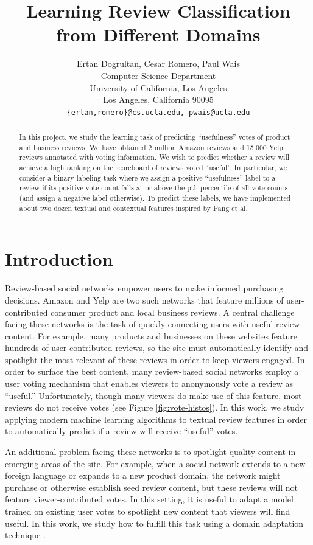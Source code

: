 \documentclass[letterpaper]{article}
\title{Learning Review Classification from Different Domains}
\author{Ertan Dogrultan, Cesar Romero, Paul Wais\\
Computer Science Department \\
University of California, Los Angeles\\
Los Angeles, California 90095\\
\texttt{\{ertan,romero\}@cs.ucla.edu, pwais@ucla.edu}}
\begin{document}
\maketitle
\begin{abstract}
  In this project, we study the learning task of predicting
  ``usefulness'' votes of product and business reviews.  We have
  obtained 2 million Amazon reviews and 15,000 Yelp reviews annotated
  with voting information.  We wish to predict whether a review will
  achieve a high ranking on the scoreboard of reviews voted
  ``useful''.  In particular, we consider a binary labeling task where
  we assign a positive ``usefulness'' label to a review if its
  positive vote count falls at or above the pth percentile of all vote
  counts (and assign a negative label otherwise).  To predict these
  labels, we have implemented about two dozen textual and contextual
  features inspired by Pang et al. \cite{PangSentimentClassification}
\end{abstract}

\section{Introduction}
\label{sec:introduction}

Review-based social networks empower users to make informed purchasing
decisions.  Amazon and Yelp are two such networks that feature
millions of user-contributed consumer product and local business
reviews.  A central challenge facing these networks is the task of
quickly connecting users with useful review content.  For example,
many products and businesses on these websites feature hundreds of
user-contributed reviews, so the site must automatically identify and
spotlight the most relevant of these reviews in order to keep viewers
engaged.  In order to surface the best content, many review-based
social networks employ a user voting mechanism that enables viewers to
anonymously vote a review as ``useful.''  Unfortunately, though many
viewers do make use of this feature, most reviews do not receive votes
(see Figure \ref{fig:vote-histos}).  In this work, we study applying modern
machine learning algorithms to textual review features in order to
automatically predict if a review will receive ``useful'' votes.

An additional problem facing these networks is to spotlight quality
content in emerging areas of the site.  For example, when a social
network extends to a new foreign language or expands to a new product
domain, the network might purchase or otherwise establish seed review
content, but these reviews will not feature viewer-contributed votes.
In this setting, it is useful to adapt a model trained on existing
user votes to spotlight new content that viewers will find useful.  In
this work, we study how to fulfill this task using a domain adaptation
technique \cite{JennLearnDiffDomains}.
\end{document}
